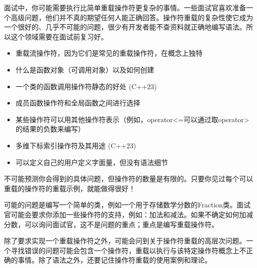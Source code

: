 
面试中，你可能需要执行比简单重载操作符更复杂的事情。一些面试官喜欢准备一个高级问题，他们并不真的期望任何人能正确回答。操作符重载的复杂性使它成为一个很好的、几乎不可能的问题，很少有开发者能不查资料就正确地编写语法。所以这个领域需要在面试前复习好。


\begin{itemize}
\item
重载流操作符，因为它们是常见的重载操作符，在概念上独特

\item
什么是函数对象（可调用对象）以及如何创建

\item
一个类的函数调用操作符静态的好处 (C++23)

\item
成员函数操作符和全局函数之间进行选择

\item
某些操作符可以用其他操作符表示（例如，operator<=可以通过取operator>的结果的负数来编写）

\item
多维下标索引操作符及其用途 (C++23)

\item
可以定义自己的用户定义字面量，但没有语法细节
\end{itemize}


不可能预测你会得到的具体问题，但操作符的数量是有限的。只要你见过每个可以重载的操作符的重载示例，就能做得很好！

可能的问题是编写一个简单的类，例如一个用于存储数学分数的Fraction类。面试官可能会要求你添加一些操作符的支持，例如：加法和减法。如果不确定如何加减分数，可以询问面试官，这不是问题的重点；重点是编写重载操作符。

除了要求实现一个重载操作符之外，可能会问到关于操作符重载的高层次问题。一个寻找错误的问题可能会包含一个操作符，重载以执行与该特定操作符概念上不正确的事情。除了语法之外，还要记住操作符重载的使用案例和理论。

